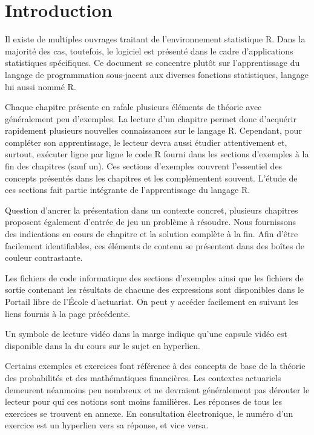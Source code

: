 \chapter*{Introduction}

Il existe de multiples ouvrages traitant de l'environnement
statistique R. Dans la majorité des cas, toutefois, le logiciel est
présenté dans le cadre d'applications statistiques spécifiques. Ce
document se concentre plutôt sur l'apprentissage du langage de
programmation sous-jacent aux diverses fonctions statistiques, langage
lui aussi nommé R.

Chaque chapitre présente en rafale plusieurs éléments de théorie avec
généralement peu d'exemples. La lecture d'un chapitre permet donc
d'acquérir rapidement plusieurs nouvelles connaissances sur le langage
R. Cependant, pour compléter son apprentissage, le lecteur devra aussi
étudier attentivement et, surtout, exécuter ligne par ligne le code R
fourni dans les sections d'exemples à la fin des chapitres (sauf un).
Ces sections d'exemples couvrent l'essentiel des concepts présentés
dans les chapitres et les complémentent souvent. L'étude de ces
sections fait partie intégrante de l'apprentissage du langage R.

Question d'ancrer la présentation dans un contexte concret, plusieurs
chapitres proposent également d'entrée de jeu un problème à résoudre.
Nous fournissons des indications en cours de chapitre et la solution
complète à la fin. Afin d'être facilement identifiables, ces éléments
de contenu se présentent dans des boîtes de couleur contrastante.

Les fichiers de code informatique des sections d'exemples ainsi que
les fichiers de sortie contenant les résultats de chacune des
expressions sont disponibles dans le Portail libre de l'École
d'actuariat. On peut y accéder facilement en suivant les liens fournis
à la page précédente.

Un symbole de lecture vidéo dans la marge indique qu'une capsule vidéo
est disponible dans la %
du cours sur le sujet en hyperlien.

Certains exemples et exercices font référence à des concepts de base
de la théorie des probabilités et des mathématiques financières. Les
contextes actuariels demeurent néanmoins peu nombreux et ne devraient
généralement pas dérouter le lecteur pour qui ces notions sont moins
familières. Les réponses de tous les exercices se trouvent en annexe.
En consultation électronique, le numéro d'un exercice est un hyperlien
vers sa réponse, et vice versa.

